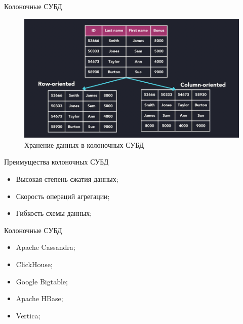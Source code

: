 \documentclass{beamer}
\begin{document}
\begin{frame}{Колоночные СУБД}
	\begin{figure}[H]
		\centering
		\begin{minipage}[t]{.88\textwidth}
			\centering
			\includegraphics[width=\linewidth]{./imgs/columnar-database.png}
			\caption*{Хранение данных в колоночных СУБД}
		\end{minipage}
	\end{figure}
\end{frame}

\begin{frame}{Преимущества колоночных СУБД}
	\begin{itemize}
		\item Высокая степень сжатия данных;
		\item Скорость операций агрегации;
		\item Гибкость схемы данных;
	\end{itemize}
\end{frame}

\begin{frame}{Колоночные СУБД}
	\begin{itemize}
		\item Apache Cassandra;
		\item ClickHouse;
		\item Google Bigtable;
		\item Apache HBase;
		\item Vertica;
	\end{itemize}
\end{frame}
\end{document}
